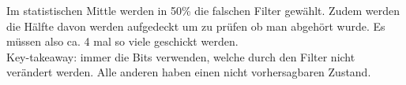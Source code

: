 \documentclass[12pt]{scrartcl}
\begin{document}
Im statistischen Mittle werden in 50\% die falschen Filter gewählt. Zudem werden
die Hälfte davon werden aufgedeckt um zu prüfen ob man abgehört wurde. Es müssen
also ca. 4 mal so viele geschickt werden. \\


Key-takeaway: immer die Bits verwenden, welche durch den Filter nicht verändert werden. Alle
anderen haben einen nicht vorhersagbaren Zustand.















\end{document}
